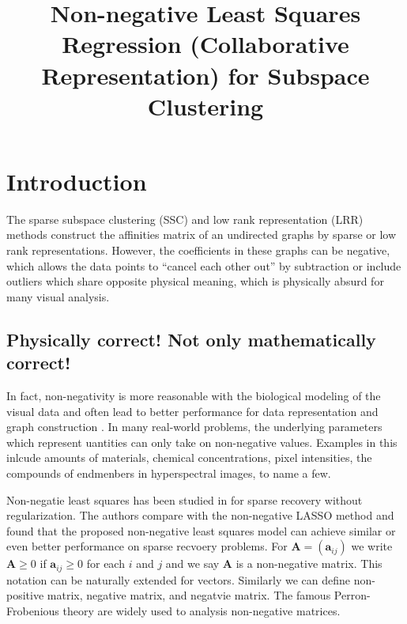 \documentclass[10pt,twocolumn,letterpaper]{article}
\begin{document}
\title{Non-negative Least Squares Regression (Collaborative Representation) for Subspace Clustering}

\maketitle



\begin{abstract}

\end{abstract}

\section{Introduction}

The sparse subspace clustering (SSC) \cite{ssc} and low rank representation (LRR) \cite{lrr} methods construct the affinities matrix of an undirected graphs by sparse or low rank representations. However, the coefficients in these graphs can be negative, which allows the data points to ``cancel each other out'' by subtraction or include outliers which share opposite physical meaning, which is physically absurd for many visual analysis.

\subsection{Physically correct! Not only mathematically correct!}

In fact, non-negativity is more reasonable with the biological modeling of the visual data and often lead to better performance for data representation \cite{} and graph construction \cite{}. In many real-world problems, the underlying parameters which represent uantities can only take on non-negative values. Examples in this inlcude amounts of materials, chemical concentrations, pixel intensities, the compounds of endmenbers in hyperspectral images, to name a few.

Non-negatie least squares has been studied in \cite{slawski2013non} for sparse recovery without regularization. The authors compare with the non-negative LASSO method \cite{kim2007interior} and found that the proposed non-negative least squares model can achieve similar or even better performance on sparse recvoery problems. For $\bm{A}=(\bm{a}_{ij})$ we write $\bm{A}\ge0$ if $\bm{a}_{ij}\ge0$ for each $i$ and $j$ and we say $\bm{A}$ is a non-negative matrix. This notation can be naturally extended for vectors. Similarly we can define non-positive matrix, negative matrix, and negatvie matrix. The famous Perron-Frobenious theory are widely used to analysis non-negative matrices.
\end{document}
